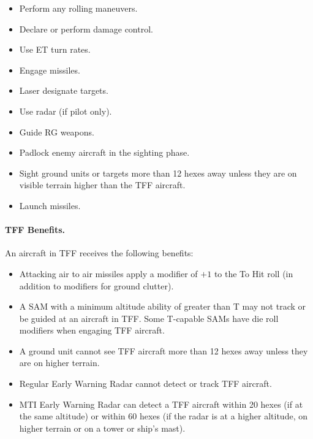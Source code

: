 \begin{itemize}
    \item Perform any rolling maneuvers.
    \item Declare or perform damage control.
    \item Use ET turn rates.
    \item Engage missiles.
    \item Laser designate targets.
    \item Use radar (if pilot only).
    \item Guide RG weapons.
    \item Padlock enemy aircraft in the sighting phase.
    \item Sight ground units or targets more than 12 hexes away unless they are on visible terrain higher than the TFF aircraft.
    \item Launch missiles.
\end{itemize}

\paragraph{TFF Benefits.} An aircraft in TFF receives the following benefits:

\begin{itemize}
    \item Attacking air to air missiles apply a modifier of $+1$ to the To Hit roll (in addition to modifiers for ground clutter).
    \item A SAM with a minimum altitude ability of greater than T may not track or be guided at an aircraft in TFF. Some T-capable SAMs have die roll modifiers when engaging TFF aircraft.
    \item A ground unit cannot see TFF aircraft more than 12 hexes away unless they are on higher terrain.
    \item Regular Early Warning Radar cannot detect or track TFF aircraft.
    \item MTI Early Warning Radar can detect a TFF aircraft within 20 hexes (if at the same altitude) or within 60 hexes (if the radar is at a higher altitude, on higher terrain or on a tower or ship's mast).
\end{itemize}
